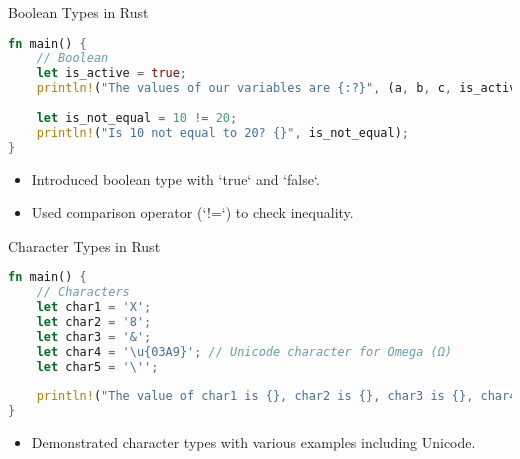 \documentclass[aspectratio=169, table]{beamer}
\begin{document}
\begin{frame}[fragile]{Boolean Types in Rust}
\begin{lstlisting}[language=Rust]
fn main() {
	// Boolean
	let is_active = true;
	println!("The values of our variables are {:?}", (a, b, c, is_active));
	
	let is_not_equal = 10 != 20;
	println!("Is 10 not equal to 20? {}", is_not_equal);
}
\end{lstlisting}
\begin{itemize}
\item Introduced boolean type with `true` and `false`.
\item Used comparison operator (`!=`) to check inequality.
\end{itemize}
\end{frame}

\begin{frame}[fragile]{Character Types in Rust}
\begin{lstlisting}[language=Rust]
fn main() {
	// Characters
	let char1 = 'X';
	let char2 = '8';
	let char3 = '&';
	let char4 = '\u{03A9}'; // Unicode character for Omega (Ω)
	let char5 = '\'';
	
	println!("The value of char1 is {}, char2 is {}, char3 is {}, char4 is {} and char5 is {}", char1, char2, char3, char4, char5);
}
\end{lstlisting}
\begin{itemize}
\item Demonstrated character types with various examples including Unicode.
\end{itemize}
\end{frame}
\end{document}
